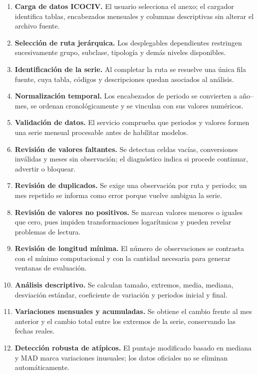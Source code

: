 \documentclass[12pt,letterpaper]{article}
\begin{document}
\begin{enumerate}[leftmargin=*,label=\textbf{\arabic*.}]
    \item \textbf{Carga de datos ICOCIV.} El usuario selecciona el anexo; el cargador identifica tablas, encabezados mensuales y columnas descriptivas sin alterar el archivo fuente.
    \item \textbf{Selección de ruta jerárquica.} Los desplegables dependientes restringen sucesivamente grupo, subclase, tipología y demás niveles disponibles.
    \item \textbf{Identificación de la serie.} Al completar la ruta se resuelve una única fila fuente, cuya tabla, códigos y descripciones quedan asociados al análisis.
    \item \textbf{Normalización temporal.} Los encabezados de periodo se convierten a año--mes, se ordenan cronológicamente y se vinculan con sus valores numéricos.
    \item \textbf{Validación de datos.} El servicio comprueba que periodos y valores formen una serie mensual procesable antes de habilitar modelos.
    \item \textbf{Revisión de valores faltantes.} Se detectan celdas vacías, conversiones inválidas y meses sin observación; el diagnóstico indica si procede continuar, advertir o bloquear.
    \item \textbf{Revisión de duplicados.} Se exige una observación por ruta y periodo; un mes repetido se informa como error porque vuelve ambigua la serie.
    \item \textbf{Revisión de valores no positivos.} Se marcan valores menores o iguales que cero, pues impiden transformaciones logarítmicas y pueden revelar problemas de lectura.
    \item \textbf{Revisión de longitud mínima.} El número de observaciones se contrasta con el mínimo computacional y con la cantidad necesaria para generar ventanas de evaluación.
    \item \textbf{Análisis descriptivo.} Se calculan tamaño, extremos, media, mediana, desviación estándar, coeficiente de variación y periodos inicial y final.
    \item \textbf{Variaciones mensuales y acumuladas.} Se obtiene el cambio frente al mes anterior y el cambio total entre los extremos de la serie, conservando las fechas reales.
    \item \textbf{Detección robusta de atípicos.} El puntaje modificado basado en mediana y MAD marca variaciones inusuales; los datos oficiales no se eliminan automáticamente.

\end{enumerate}
\end{document}
